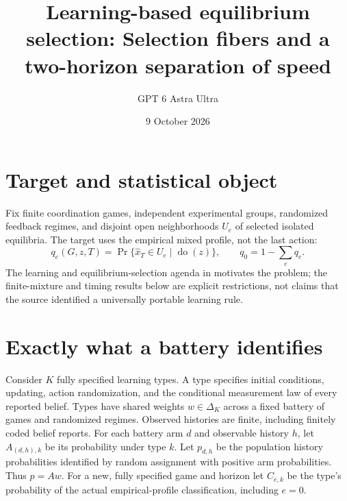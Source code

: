 \documentclass[11pt]{article}
\title{Learning-based equilibrium selection: Selection fibers and a two-horizon separation of speed}
\author{GPT 6 Astra Ultra}
\date{9 October 2026}
\theoremstyle{definition}
\begin{document}
\maketitle

\section*{Target and statistical object}
Fix finite coordination games, independent experimental groups, randomized
feedback regimes, and disjoint open neighborhoods $U_e$ of selected isolated
equilibria. The target uses the empirical mixed profile, not the last action:
\[
 q_e(G,z,T)=\Pr\{\widehat x_T\in U_e\mid\operatorname{do}(z)\},
 \qquad q_0=1-\sum_e q_e.
\]
The learning and equilibrium-selection agenda in
\cite[pp. 153--154,165--166]{fl} motivates the problem; the finite-mixture
and timing results below are explicit restrictions, not claims that the
source identified a universally portable learning rule.

\section*{Exactly what a battery identifies}
Consider $K$ fully specified learning types. A type specifies initial
conditions, updating, action randomization, and the conditional measurement
law of every reported belief. Types have shared weights $w\in\Delta_K$
across a fixed battery of games and randomized regimes. Observed histories
are finite, including finitely coded belief reports. For each battery arm
$d$ and observable history $h$, let $A_{(d,h),k}$ be its probability under
type $k$. Let $p_{d,h}$ be the population history probabilities identified
by random assignment with positive arm probabilities. Thus $p=Aw$.
For a new, fully specified game and horizon let $C_{e,k}$ be the type's
probability of the actual empirical-profile classification, including $e=0$.
\end{document}
